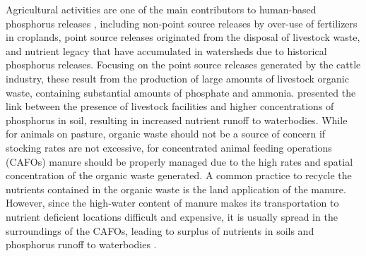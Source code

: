\documentclass[authoryear]{elsarticle}
\begin{document}
Agricultural activities are one of the main contributors to human-based phosphorus releases \citep{Dzombak}, including non-point source releases by over-use of fertilizers in croplands, point source releases originated from the disposal of livestock waste, and nutrient legacy that have accumulated in watersheds due to historical phosphorus releases. Focusing on the point source releases generated by the cattle industry, these result from the production of large amounts of livestock organic waste, containing substantial amounts of phosphate and ammonia. \citet{Sampat2017} presented the link between the presence of livestock facilities and higher concentrations of phosphorus in soil, resulting in increased nutrient runoff to waterbodies. While for animals on pasture, organic waste should not be a source of concern if stocking rates are not excessive, for concentrated animal feeding operations (CAFOs) manure should be properly managed due to the high rates and spatial concentration of the organic waste generated.
A common practice to recycle the nutrients contained in the organic waste is the land application of the manure. However, since the high-water content of manure makes its transportation to nutrient deficient locations difficult and expensive, it is usually spread in the surroundings of the CAFOs, leading to surplus of nutrients in soils and phosphorus runoff to waterbodies \citep{USDAHandbook}.
\end{document}
